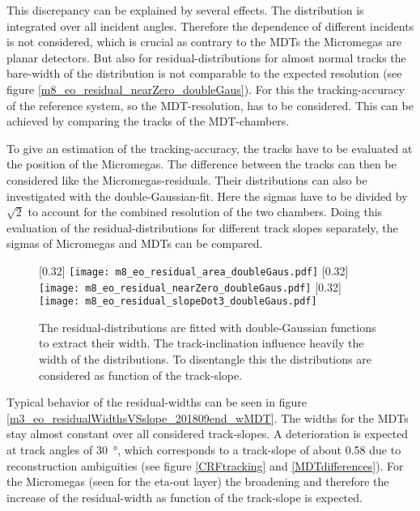 \documentclass[
twoside,            %
BCOR1.4cm,          %
10pt,               %
headings=normal,    %
headsepline,        %
clearplainpage,		%
final,              %
div=14,
open=right,
bibliography=toc
]{scrreprt}
\begin{document}
This discrepancy can be explained by several effects.
The distribution is integrated over all incident angles.
Therefore the dependence of different incidents is not considered, which is crucial as contrary to the MDTs the Micromegas are planar detectors.
But also for residual-distributions for almost normal tracks the bare-width of the distribution is not comparable to the expected resolution (see figure \ref{m8_eo_residual_nearZero_doubleGaus}).
For this the tracking-accuracy of the reference system, so the MDT-resolution, has to be considered.
This can be achieved by comparing the tracks of the MDT-chambers.

To give an estimation of the tracking-accuracy, the tracks have to be evaluated at the position of the Micromegas.
The difference between the tracks can then be considered like the Micromegas-residuals. 
Their distributions can also be investigated with the double-Gaussian-fit.
Here the sigmas have to be divided by $\sqrt{2}$ to account for the combined resolution of the two chambers.
Doing this evaluation of the residual-distributions for different track slopes separately, the sigmas of Micromegas and MDTs can be compared.

\begin{figure}[!h]
	\centering
	[0.32\textwidth]
	{\texttt{[image: m8\_eo\_residual\_area\_doubleGaus.pdf]}}
	\hfill
	[0.32\textwidth]
	{\texttt{[image: m8\_eo\_residual\_nearZero\_doubleGaus.pdf]}}
	\hfill
	[0.32\textwidth]
	{\texttt{[image: m8\_eo\_residual\_slopeDot3\_doubleGaus.pdf]}}
	\vspace{-2mm}
	\caption{
		The residual-distributions are fitted with double-Gaussian functions to extract their width.
		The track-inclination influence heavily the width of the distributions.
		To disentangle this the distributions are considered as function of the track-slope.
	}
	\label{fittedResidualDistributions} 
\end{figure}

Typical behavior of the residual-widths can be seen in figure \ref{m3_eo_residualWidthsVSslope_201809end_wMDT}.
The widths for the MDTs stay almost constant over all considered track-slopes.
A deterioration is expected at track angles of \SI{30}{\degree}, which corresponds to a track-slope of about 0.58 due to reconstruction ambiguities (see figure \ref{CRFtracking} and \ref{MDTdifferences}).
For the Micromegas (seen for the eta-out layer) the broadening and therefore the increase of the residual-width as function of the track-slope is expected. 
\end{document}
